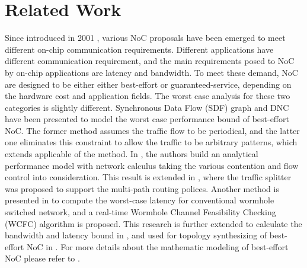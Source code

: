 \documentclass[10pt,journal]{IEEEtran}
\begin{document}
\section{Related Work}\label{related}
Since introduced in 2001 \cite{DaTo01}, various NoC proposals have been emerged to meet different on-chip communication requirements. Different applications have different communication requirement, and the main requirements posed to NoC by on-chip applications are latency and bandwidth. To meet these demand, NoC are designed to be either either best-effort or guaranteed-service, depending on the hardware cost and application fields. The worst case analysis for these two categories is slightly different. Synchronous Data Flow (SDF) graph \cite{poplavko2003task} and DNC \cite{qian2009analysis} have been presented to model the worst case performance bound of best-effort NoC. The former method assumes the traffic flow to be periodical, and the latter one eliminates this constraint to allow the traffic to be arbitrary patterns, which extends applicable of the method. In \cite{qian2009analysis}, the authors build an analytical performance model with network calculus taking the various contention and flow control into consideration. This result is extended in \cite{Du:2012:WPA:2380445.2380469}, where the traffic splitter was proposed to support the multi-path routing polices. Another method is presented in \cite{Lee:2003:RWC:846077.846083} to compute the worst-case latency for conventional wormhole switched network, and a real-time Wormhole Channel Feasibility Checking (WCFC) algorithm is proposed. This research is further extended to calculate the bandwidth and latency bound in \cite{6109240}, and used for topology synthesizing of best-effort NoC in \cite{EPFL-ARTICLE-186879}. For more details about the mathematic modeling of best-effort NoC please refer to \cite{Kiasari:2013:MFP:2480741.2480755}.
\end{document}
